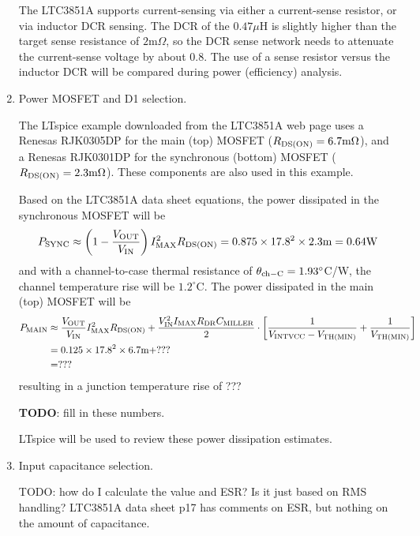 \begin{enumerate}
The LTC3851A supports current-sensing via either a current-sense
resistor, or via inductor DCR sensing. The DCR of the $0.47\mu\text{H}$
is slightly higher than the target sense resistance of $2\text{m}\Omega$,
so the DCR sense network needs to attenuate the current-sense
voltage by about 0.8. The use of a sense resistor versus the inductor
DCR will be compared during power (efficiency) analysis.

\item Power MOSFET and D1 selection.

The LTspice example downloaded from the LTC3851A web page uses a
Renesas RJK0305DP for the main (top) MOSFET 
($R_{\rm DS(ON)} = 6.7\text{m}\Omega$), and a Renesas RJK0301DP
for the synchronous (bottom) MOSFET ($R_{\rm DS(ON)} = 2.3\text{m}\Omega$).
These components are also used in this example.

Based on the LTC3851A data sheet equations, the power dissipated
in the synchronous MOSFET will be
%
\begin{equation}
P_{\rm SYNC} \approx \left(1 - \frac{V_{\rm OUT}}{V_{\rm IN}}\right)
I_{\rm MAX}^2R_{\rm DS(ON)} = 0.875\times17.8^2\times2.3\text{m} = 0.64\text{W}
\end{equation}
%
and with a channel-to-case thermal resistance of $\theta_{\rm ch-C} = 1.93^\circ$C/W,
the channel temperature rise will be $1.2^\circ$C. The power dissipated in the
main (top) MOSFET will be
%
\begin{equation}
\begin{split}
P_{\rm MAIN} &\approx \frac{V_{\rm OUT}}{V_{\rm IN}}I_{\rm MAX}^2R_{\rm DS(ON)} +
\frac{V_{\rm IN}^2I_{\rm MAX}R_{\rm DR}C_{\rm MILLER}}{2}\cdot
\left[ \frac{1}{V_{\rm INTVCC} - V_{\rm TH(MIN)}} + \frac{1}{V_{\rm TH(MIN)}}\right]\\
&= 0.125\times17.8^2\times6.7\text{m} +  ???\\
&= ???
\end{split}
\end{equation}
%
resulting in a junction temperature rise of ???

{\bf TODO}: fill in these numbers.

LTspice will be used to review these power dissipation estimates.

\item Input capacitance selection.

TODO: how do I calculate the value and ESR? Is it just based on
RMS handling? LTC3851A data sheet p17 has comments on ESR, but
nothing on the amount of capacitance.


\end{enumerate}
